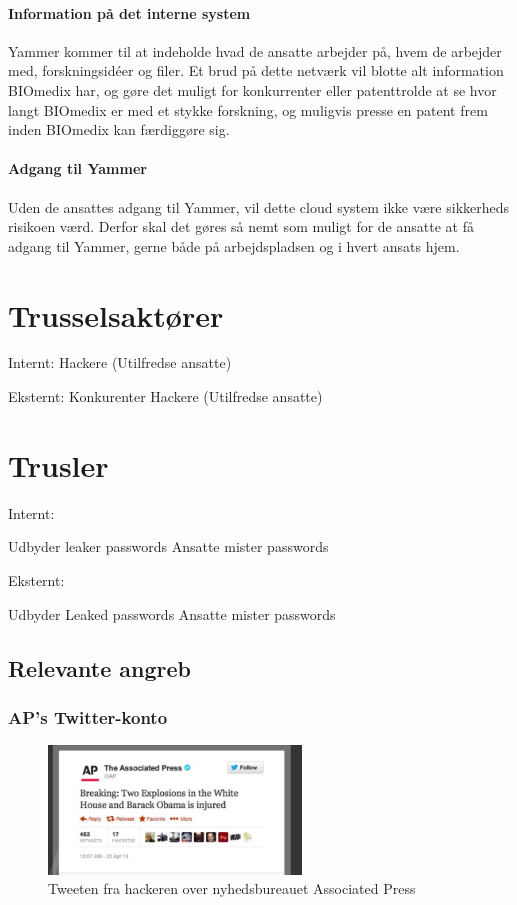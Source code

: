 \documentclass{article}
\begin{document}
\paragraph{Information på det interne system}
Yammer kommer til at indeholde hvad de ansatte arbejder på, hvem de arbejder med, forskningsidéer og filer. Et brud på dette netværk vil blotte alt information BIOmedix har, og gøre det muligt for konkurrenter eller patenttrolde at se hvor langt BIOmedix er med et stykke forskning, og muligvis presse en patent frem inden BIOmedix kan færdiggøre sig. 

\paragraph{Adgang til Yammer}
Uden de ansattes adgang til Yammer, vil dette cloud system ikke være sikkerheds risikoen værd. Derfor skal det gøres så nemt som muligt for de ansatte at få adgang til Yammer, gerne både på arbejdspladsen og i hvert ansats hjem.  


\section{Trusselsaktører}

Internt:
Hackere
(Utilfredse ansatte)


Eksternt:
Konkurenter
Hackere
(Utilfredse ansatte)

\section{Trusler}

Internt:

Udbyder leaker passwords
Ansatte mister passwords

Eksternt:

Udbyder Leaked passwords
Ansatte mister passwords

\subsection{Relevante angreb}
\subsubsection{AP's Twitter-konto}

\begin{figure}
  \begin{center}
    \includegraphics[width=0.6\textwidth]{../Pictures/APTweet.jpg}
  \end{center}
  \caption{Tweeten fra hackeren over nyhedsbureauet Associated Press \cite{APTweetSource}}
\end{figure}
\end{document}
